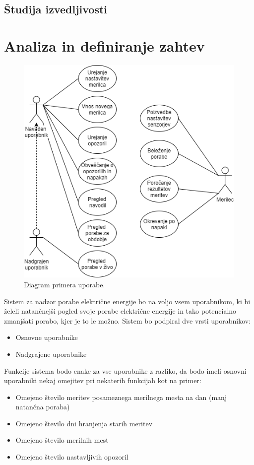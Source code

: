 \documentclass[12pt,a4paper,titlepage,openany]{report}
\begin{document}
\section{Študija izvedljivosti}
\thispagestyle{fancy}


\chapter{Analiza in definiranje zahtev}
\thispagestyle{fancy}

\begin{figure}[H]
\begin{center}
\includegraphics[width=1\textwidth, height=0.9\textheight,keepaspectratio]{Slike/UseCase.png}
\end{center}
\caption{Diagram primera uporabe.}\label{slika:UseCase}
\end{figure}

\newpage
Sistem za nadzor porabe električne energije bo na voljo vsem uporabnikom, ki bi želeli natančnejši pogled svoje porabe električne energije in tako potencialno zmanjšati porabo, kjer je to le možno. Sistem bo podpiral dve vrsti uporabnikov:
\begin{itemize}
\item Osnovne uporabnike
\item Nadgrajene uporabnike
\end{itemize}
Funkcije sistema bodo enake za vse uporabnike z razliko, da bodo imeli osnovni uporabniki nekaj omejitev pri nekaterih funkcijah kot na primer:
\begin{itemize}
\item Omejeno število meritev posameznega merilnega mesta na dan (manj natančna poraba)
\item Omejeno število dni hranjenja starih meritev
\item Omejeno število merilnih mest
\item Omejeno število nastavljivih opozoril
\end{itemize}
\end{document}
